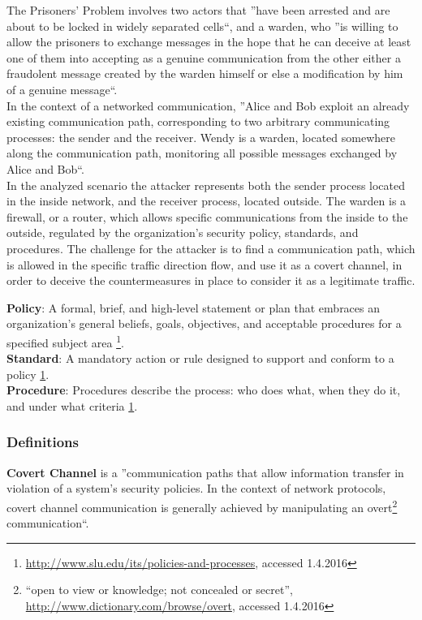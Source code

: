 \documentclass[12pt]{article}
\begin{document}
The Prisoners' Problem\cite{prisoners} involves two actors that ''have been arrested and are about to be locked in widely separated cells``, and a warden, who ''is willing to allow the prisoners 
to exchange messages in the hope that he can deceive at least one of them into accepting as a genuine communication from the other either a fraudolent message created by the warden himself or else a modification by him 
of a genuine message``.\\
In the context of a networked communication, ''Alice and Bob exploit an already existing communication path, corresponding to two arbitrary communicating processes: the sender and the receiver. Wendy is a warden, located 
somewhere along the communication path, monitoring all possible messages exchanged by Alice and Bob``\cite{netaware}.\\
In the analyzed scenario the attacker represents both the sender process located in the inside network, and the receiver process, located outside. The warden is a firewall, or a router, which allows specific communications 
from the inside to the outside, regulated by the organization's security policy, standards, and procedures. The challenge for the attacker is to find a communication path, which is allowed in the specific traffic direction flow, and use it as a 
covert channel, in order to deceive the countermeasures in place to consider it as a legitimate traffic.

\textbf{Policy}: A formal, brief, and high-level statement or plan that embraces an organization's general beliefs, goals, objectives, and acceptable procedures for a specified subject area 
\footnote{\label{policy}\url{http://www.slu.edu/its/policies-and-processes}, accessed 1.4.2016}.\\
\textbf{Standard}: A mandatory action or rule designed to support and conform to a policy \cref{policy}.\\
\textbf{Procedure}: Procedures describe the process: who does what, when they do it, and under what criteria \cref{policy}.

\subsubsection{Definitions}
\label{subsub:definitions}

\textbf{Covert Channel} is a ''communication paths that allow information transfer in violation of a system’s security policies. In the context of network protocols, covert channel communication is generally achieved by 
manipulating an overt\footnote{``open to view or knowledge; not concealed or secret'', \url{http://www.dictionary.com/browse/overt}, accessed 1.4.2016} communication``\cite{netaware}.
\end{document}
